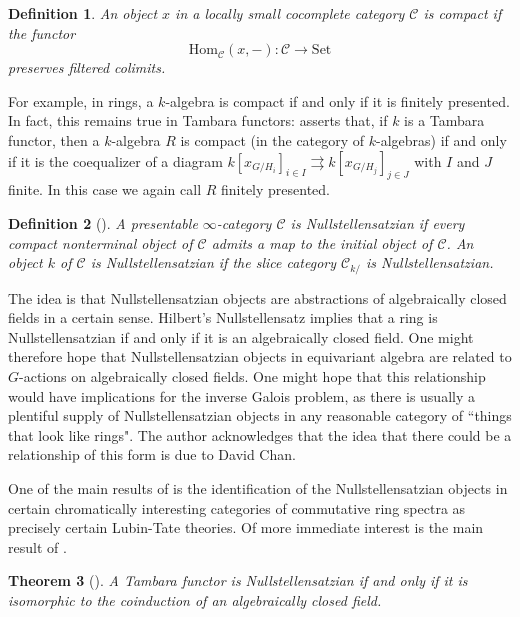 \documentclass[11pt,dvipsnames]{amsart}
\newtheorem{theorem}{Theorem}[section]
\theoremstyle{BoldRemark}
\newtheorem{definition}[theorem]{Definition}
\newcommand{\Set}{\mathrm{Set}}
\begin{document}
\begin{definition}
	An object $x$ in a locally small cocomplete category $\mathcal{C}$ is \emph{compact} if the functor \[ \mathrm{Hom}_{\mathcal{C}}(x,-) : \mathcal{C} \rightarrow \Set \] preserves filtered colimits.
\end{definition}

For example, in rings, a $k$-algebra is compact if and only if it is finitely presented. In fact, this remains true in Tambara functors: \cite[Proposition 4.3]{SSW24} asserts that, if $k$ is a Tambara functor, then a $k$-algebra $R$ is compact (in the category of $k$-algebras) if and only if it is the coequalizer of a diagram $k[x_{G/H_i}]_{i \in I} \rightrightarrows k[x_{G/H_j}]_{j \in J}$ with $I$ and $J$ finite. In this case we again call $R$ finitely presented.

\begin{definition}[\cite{BSY22}]
	A presentable $\infty$-category $\mathcal{C}$ is \emph{Nullstellensatzian} if every compact nonterminal object of $\mathcal{C}$ admits a map to the initial object of $\mathcal{C}$. An object $k$ of $\mathcal{C}$ is Nullstellensatzian if the slice category $\mathcal{C}_{k /}$ is Nullstellensatzian.
\end{definition}

The idea is that Nullstellensatzian objects are abstractions of algebraically closed fields in a certain sense. Hilbert's Nullstellensatz implies that a ring is Nullstellensatzian if and only if it is an algebraically closed field. One might therefore hope that Nullstellensatzian objects in equivariant algebra are related to $G$-actions on algebraically closed fields. One might hope that this relationship would have implications for the inverse Galois problem, as there is usually a plentiful supply of Nullstellensatzian objects in any reasonable category of ``things that look like rings". The author acknowledges that the idea that there could be a relationship of this form is due to David Chan.

One of the main results of \cite{BSY22} is the identification of the Nullstellensatzian objects in certain chromatically interesting categories of commutative ring spectra as precisely certain Lubin-Tate theories. Of more immediate interest is the main result of \cite{SSW24}.

\begin{theorem}[\cite{SSW24}]
	A Tambara functor is Nullstellensatzian if and only if it is isomorphic to the coinduction of an algebraically closed field.
\end{theorem}
\end{document}
